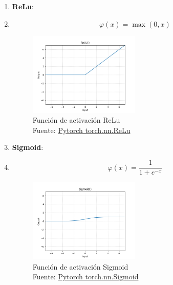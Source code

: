\begin{enumerate}
    \item \textbf{ReLu}:
    \item[] \begin{equation} \varphi(x) = \operatorname*{max}(0,x) \end{equation}
        \begin{figure}[H]
            \centering
            \includegraphics[width=0.5\textwidth]{figures/equations/ReLu.png}
            \caption{Función de activación ReLu\\Fuente: \href{https://pytorch.org/docs/stable/generated/torch.nn.ReLu.html}{Pytorch torch.nn.ReLu}}
            \label{fig:torch.nn.ReLu}
        \end{figure}

    \item \textbf{Sigmoid}:
    \item[] \begin{equation} \varphi(x) = \frac{1}{1+e^{-x}} \end{equation}
        \begin{figure}[H]
            \centering
            \includegraphics[width=0.5\textwidth]{figures/equations/Sigmoid.png}
            \caption{Función de activación Sigmoid\\Fuente: \href{https://pytorch.org/docs/stable/generated/torch.nn.Sigmoid.html}{Pytorch torch.nn.Sigmoid}}
            \label{fig:torch.nn.Sigmoid}
        \end{figure}


\end{enumerate}
